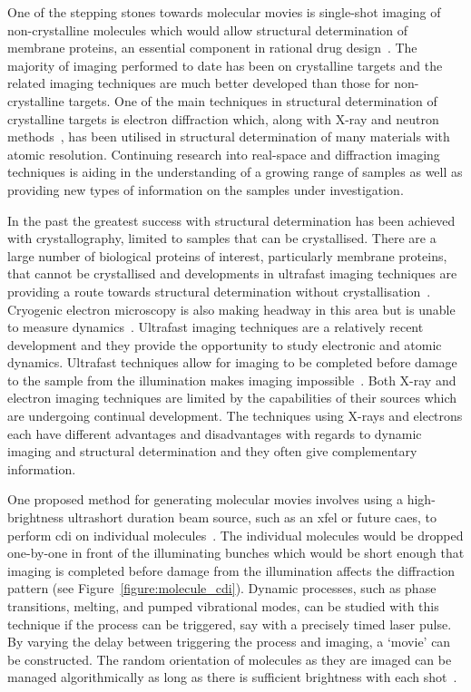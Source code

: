 One of the stepping stones towards molecular movies is single-shot imaging of non-crystalline molecules which would allow structural determination of membrane proteins, an essential component in rational drug design~\cite{hardy_atomic_1987, barrett_discovering_1999, pinto_influenza_1992}.
The majority of imaging performed to date has been on crystalline targets and the related imaging techniques are much better developed than those for non-crystalline targets.
One of the main techniques in structural determination of crystalline targets is electron diffraction which, along with X-ray and neutron methods~\cite{cullity_elements_2001,bacon_x-ray_2013}, has been utilised in structural determination of many materials with atomic resolution.
Continuing research into real-space and diffraction imaging techniques is aiding in the understanding of a growing range of samples as well as providing new types of information on the samples under investigation.

In the past the greatest success with structural determination has been achieved with crystallography, limited to samples that can be crystallised.
There are a large number of biological proteins of interest, particularly membrane proteins, that cannot be crystallised and developments in ultrafast imaging techniques are providing a route towards structural determination without crystallisation~\cite{dauter_current_2006,levitt_nature_2009}.
Cryogenic electron microscopy is also making headway in this area but is unable to measure dynamics~\cite{henderson_model_1990,zhou_towards_2008}.
Ultrafast imaging techniques are a relatively recent development and they provide the opportunity to study electronic and atomic dynamics.
Ultrafast techniques allow for imaging to be completed before damage to the sample from the illumination makes imaging impossible~\cite{gaffney_imaging_2007,barty_ultrafast_2008,miao_beyond_2015}.
Both X-ray and electron imaging techniques are limited by the capabilities of their sources which are undergoing continual development.
The techniques using X-rays and electrons each have different advantages and disadvantages with regards to dynamic imaging and structural determination and they often give complementary information.

One proposed method for generating molecular movies involves using a high-brightness ultrashort duration beam source, such as an \gls{xfel} or future \gls{caes}, to perform \gls{cdi} on individual molecules~\cite{chapman_femtosecond_2006,dwyer_femtosecond_2006,gaffney_imaging_2007}.
The individual molecules would be dropped one-by-one in front of the illuminating bunches which would be short enough that imaging is completed before damage from the illumination affects the diffraction pattern (see Figure~\ref{figure:molecule_cdi}).
Dynamic processes, such as phase transitions, melting, and pumped vibrational modes, can be studied with this technique if the process can be triggered, say with a precisely timed laser pulse.
By varying the delay between triggering the process and imaging, a `movie' can be constructed.
The random orientation of molecules as they are imaged can be managed algorithmically as long as there is sufficient brightness with each shot~\cite{yefanov_orientation_2013}.

